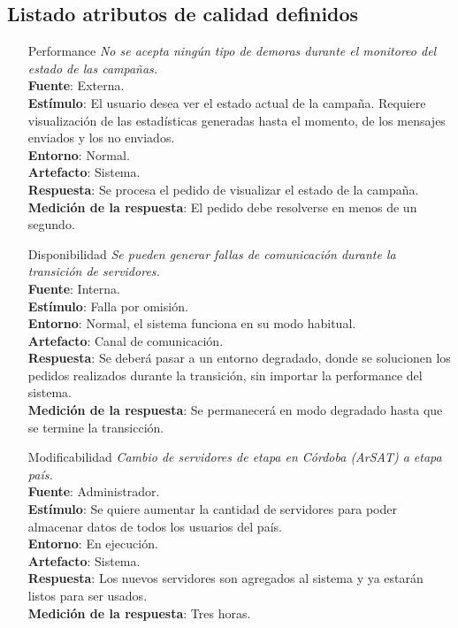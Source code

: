 \documentclass[a4paper, 11pt]{article}
\begin{document}
\subsection{Listado atributos de calidad definidos}
\begin{itemize}

\item[Performance] \textit{No se acepta ningún tipo de demoras durante el monitoreo del estado de las campa\~nas.}\\
\textbf{Fuente}: Externa. \\
\textbf{Estímulo}: El usuario desea ver el estado actual de la campa\~na. Requiere visualización de las estadísticas generadas hasta el momento, de los mensajes enviados y los no enviados. \\
\textbf{Entorno}: Normal.\\
\textbf{Artefacto}: Sistema.\\
\textbf{Respuesta}: Se procesa el pedido de visualizar el estado de la campa\~na.\\
\textbf{Medición de la respuesta}: El pedido debe resolverse en menos de un segundo. \\

\item[Disponibilidad] \textit{Se pueden generar fallas de comunicación durante la transición de servidores.}\\
\textbf{Fuente}: Interna.\\
\textbf{Estímulo}: Falla por omisión.\\
\textbf{Entorno}: Normal, el sistema funciona en su modo habitual.\\
\textbf{Artefacto}: Canal de comunicación.\\
\textbf{Respuesta}: Se deberá pasar a un entorno degradado, donde se solucionen los pedidos realizados durante la transición, sin importar la performance del sistema.\\
\textbf{Medición de la respuesta}:  Se permanecerá en modo degradado hasta que se termine la transicción.\\

\item[Modificabilidad] \textit{Cambio de servidores de etapa en Córdoba (ArSAT) a etapa país.}\\
\textbf{Fuente}: Administrador. \\
\textbf{Estímulo}: Se quiere aumentar la cantidad de servidores para poder almacenar datos de todos los usuarios del país. \\
\textbf{Entorno}: En ejecución. \\
\textbf{Artefacto}: Sistema. \\
\textbf{Respuesta}: Los nuevos servidores son agregados al sistema y ya estarán listos para ser usados. \\
\textbf{Medición de la respuesta}:  Tres horas.\\


\end{itemize}
\end{document}
